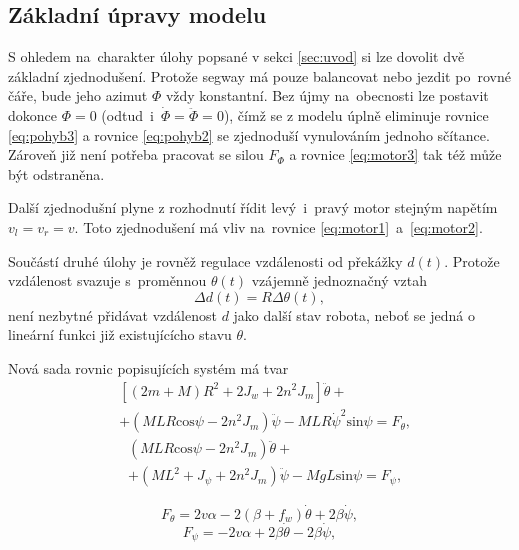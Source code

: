 \documentclass[conference]{IEEEtran}
\begin{document}
\subsection{Základní úpravy modelu}
S ohledem na~charakter úlohy popsané v sekci \ref{sec:uvod} si lze dovolit dvě základní zjednodušení. Protože segway
má pouze balancovat nebo jezdit po~rovné čáře, bude jeho azimut $\varPhi$ vždy konstantní. 
Bez újmy na~obecnosti lze postavit dokonce $\varPhi = 0$ (odtud~i~$\dot{\varPhi} = \ddot{\varPhi} = 0$),
čímž se z modelu úplně eliminuje rovnice \eqref{eq:pohyb3}
a rovnice \eqref{eq:pohyb2} se zjednoduší vynulováním jednoho sčítance. Zároveň již není potřeba pracovat se silou $F_\varPhi$
a rovnice \eqref{eq:motor3} tak též může být odstraněna.

Další zjednodušní plyne z rozhodnutí řídit levý~i~pravý motor stejným napětím $v_l = v_r = v$.
Toto zjednodušení má vliv na~rovnice \eqref{eq:motor1}~a~\eqref{eq:motor2}.

Součástí druhé úlohy je rovněž regulace vzdálenosti od překážky $d(t)$.
Protože vzdálenost svazuje s~proměnnou $\theta(t)$ vzájemně jednoznačný vztah
\begin{equation}
    \Delta d(t) = R \Delta\theta(t),
    \label{eq:vzdalenost}
\end{equation}
není nezbytné přidávat vzdálenost $d$ jako další stav robota, neboť se jedná o lineární funkci již existujícícho stavu $\theta$.

Nová sada rovnic popisujících systém má tvar
\begin{equation}
    \begin{aligned}
        &\left[(2m + M) R^2 + 2 J_w + 2n^2 J_m\right] \ddot{\theta} + \\
        &+ (MLR \text{cos} \psi - 2n^2 J_m) \ddot{\psi} - MLR\dot{\psi}^2 \text{sin} \psi = F_\theta,
    \end{aligned}
    \label{eq:pohyb1_easy}
\end{equation}
\begin{equation}
    \begin{aligned}
        & (MLR \text{cos} \psi - 2n^2 J_m) \ddot{\theta} + \\
        & + (ML^2 + J_\psi + 2n^2 J_m) \ddot{\psi} - MgL\text{sin}\psi = F_\psi,
    \end{aligned}
    \label{eq:pohyb2_easy}
\end{equation}

\begin{equation}
    F_\theta = 2v \alpha - 2(\beta + f_w) \dot{\theta} + 2\beta\dot{\psi},
    \label{eq:motor1_easy}
\end{equation}
\begin{equation}
    F_\psi = - 2v \alpha + 2\beta \dot{\theta} - 2\beta \dot{\psi},
    \label{eq:motor2_easy}
\end{equation}
\end{document}
